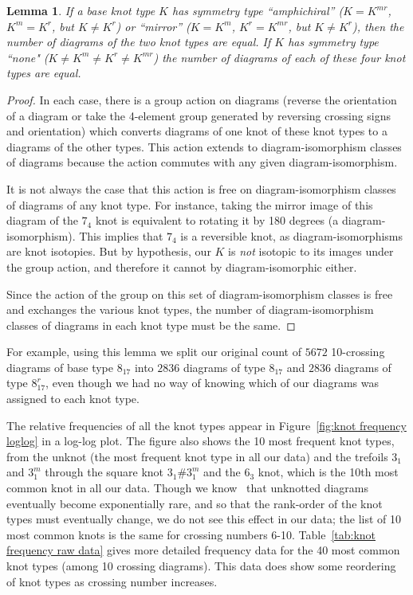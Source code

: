 \documentclass[amsmath,secnumarabic,floatfix,amssymb,nofootinbib,nobibnotes,letterpaper,11pt,tightenlines,showkeys]{revtex4}
\newtheorem{lemma}[theorem]{Lemma}
\theoremstyle{definition}
\begin{document}
\begin{lemma} 
If a base knot type $K$ has symmetry type ``amphichiral'' ($K = K^{mr}$, $K^{m} = K^r$, but $K \neq K^r$) or ``mirror'' ($K = K^m$, $K^r = K^{mr}$, but $K \neq K^r$), then the number of diagrams of the two knot types are equal. If $K$ has symmetry type ``none" ($K \neq K^m \neq K^r \neq K^{mr}$) the number of diagrams of each of these four knot types are equal.
\end{lemma}

\begin{proof}
In each case, there is a group action on diagrams (reverse the orientation of a diagram or take the 4-element group generated by reversing crossing signs and orientation) which converts diagrams of one knot of these knot types to a diagrams of the other types. This action extends to diagram-isomorphism classes of diagrams because the action commutes with any given diagram-isomorphism. 

It is not always the case that this action is free on diagram-isomorphism classes of diagrams of any knot type. For instance, taking the mirror image of this diagram of the $7_4$ knot  is equivalent to rotating it by 180 degrees (a diagram-isomorphism). This implies that $7_4$ is a reversible knot, as diagram-isomorphisms are knot isotopies. But by hypothesis, our $K$ is \emph{not} isotopic to its images under the group action, and therefore it cannot by diagram-isomorphic either.

Since the action of the group on this set of diagram-isomorphism classes is free and exchanges the various knot types, the number of diagram-isomorphism classes of diagrams in each knot type must be the same.
\end{proof}

For example, using this lemma we split our original count of $\num{5672}$ 10-crossing diagrams of base type $8_{17}$ into $\num{2836}$ diagrams of type $8_{17}$ and $\num{2836}$ diagrams of type $8_{17}^r$, even though we had no way of knowing which of our diagrams was assigned to each knot type. 

The relative frequencies of all the knot types appear in Figure~\ref{fig:knot frequency loglog} in a log-log plot. The figure also shows the 10 most frequent knot types, from the unknot (the most frequent knot type in all our data) and the trefoils $3_1$ and $3_1^m$ through the square knot $3_1 \# 3_1^m$ and the $6_3$ knot, which is the 10th most common knot in all our data. Though we know~\cite{chapman} that unknotted diagrams eventually become exponentially rare, and so that the rank-order of the knot types must eventually change, we do not see this effect in our data; the list of 10 most common knots is the same for crossing numbers 6-10. Table~\ref{tab:knot frequency raw data} gives more detailed frequency data for the 40 most common knot types (among 10 crossing diagrams). This data does show some reordering of knot types as crossing number increases.
\end{document}
